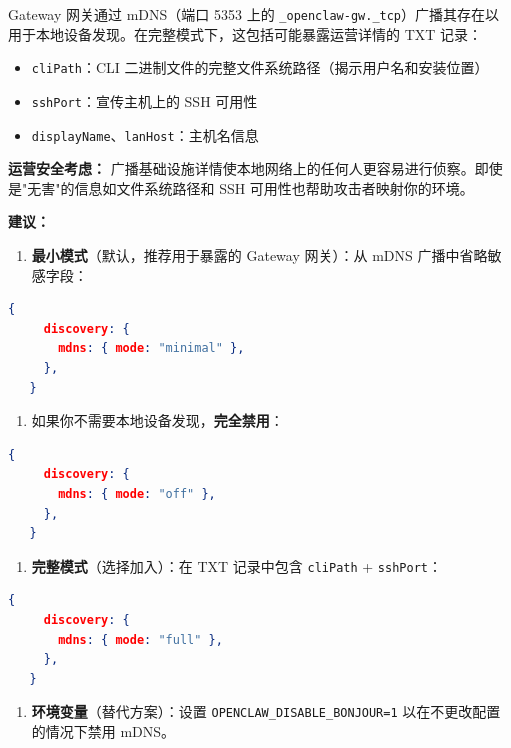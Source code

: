 Gateway 网关通过 mDNS（端口 5353 上的 \texttt{\_openclaw-gw.\_tcp}）广播其存在以用于本地设备发现。在完整模式下，这包括可能暴露运营详情的 TXT 记录：

\begin{itemize}
  \item \texttt{cliPath}：CLI 二进制文件的完整文件系统路径（揭示用户名和安装位置）
  \item \texttt{sshPort}：宣传主机上的 SSH 可用性
  \item \texttt{displayName}、\texttt{lanHost}：主机名信息
\end{itemize}


\textbf{运营安全考虑：} 广播基础设施详情使本地网络上的任何人更容易进行侦察。即使是"无害"的信息如文件系统路径和 SSH 可用性也帮助攻击者映射你的环境。

\textbf{建议：}

\begin{enumerate}
  \item \textbf{最小模式}（默认，推荐用于暴露的 Gateway 网关）：从 mDNS 广播中省略敏感字段：
\end{enumerate}


\begin{lstlisting}[language=json]
   {
     discovery: {
       mdns: { mode: "minimal" },
     },
   }
\end{lstlisting}


\begin{enumerate}
  \item 如果你不需要本地设备发现，\textbf{完全禁用}：
\end{enumerate}


\begin{lstlisting}[language=json]
   {
     discovery: {
       mdns: { mode: "off" },
     },
   }
\end{lstlisting}


\begin{enumerate}
  \item \textbf{完整模式}（选择加入）：在 TXT 记录中包含 \texttt{cliPath} + \texttt{sshPort}：
\end{enumerate}


\begin{lstlisting}[language=json]
   {
     discovery: {
       mdns: { mode: "full" },
     },
   }
\end{lstlisting}


\begin{enumerate}
  \item \textbf{环境变量}（替代方案）：设置 \texttt{OPENCLAW\_DISABLE\_BONJOUR=1} 以在不更改配置的情况下禁用 mDNS。
\end{enumerate}


